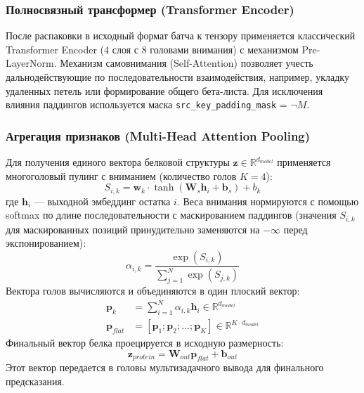 \documentclass[12pt, a4paper]{article}
\begin{document}
\subsubsection{Полносвязный трансформер (Transformer Encoder)}
После распаковки в исходный формат батча к тензору применяется классический Transformer Encoder ($4$ слоя с $8$ головами внимания) с механизмом Pre-LayerNorm. Механизм самовнимания (Self-Attention) позволяет учесть дальнодействующие по последовательности взаимодействия, например, укладку удаленных петель или формирование общего бета-листа. Для исключения влияния паддингов используется маска \texttt{src\_key\_padding\_mask} = $\neg M$.

\subsubsection{Агрегация признаков (Multi-Head Attention Pooling)}
Для получения единого вектора белковой структуры $\mathbf{z} \in \mathbb{R}^{d_{model}}$ применяется многоголовый пулинг с вниманием (количество голов $K=4$):
\begin{equation}
    S_{i, k} = \mathbf{w}_k \cdot \tanh(\mathbf{W}_{s} \mathbf{h}_i + \mathbf{b}_s) + b_k
\end{equation}
где $\mathbf{h}_i$ — выходной эмбеддинг остатка $i$. Веса внимания нормируются с помощью softmax по длине последовательности с маскированием паддингов (значения $S_{i,k}$ для маскированных позиций принудительно заменяются на $-\infty$ перед экспонированием):
\begin{equation}
    \alpha_{i, k} = \frac{\exp(S_{i, k})}{\sum_{j=1}^N \exp(S_{j, k})}
\end{equation}
Вектора голов вычисляются и объединяются в один плоский вектор:
\begin{align}
    \mathbf{p}_k &= \sum_{i=1}^N \alpha_{i, k} \mathbf{h}_i \in \mathbb{R}^{d_{model}} \\
    \mathbf{p}_{flat} &= [\mathbf{p}_1; \mathbf{p}_2; \dots; \mathbf{p}_K] \in \mathbb{R}^{K \cdot d_{model}}
\end{align}
Финальный вектор белка проецируется в исходную размерность:
\begin{equation}
    \mathbf{z}_{protein} = \mathbf{W}_{out} \mathbf{p}_{flat} + \mathbf{b}_{out}
\end{equation}
Этот вектор передается в головы мультизадачного вывода для финального предсказания.


\newpage

\end{document}
